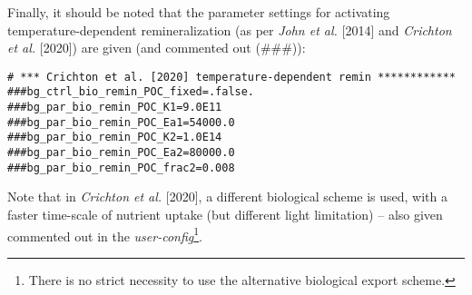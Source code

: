 \begin{itemize}[noitemsep]
\vspace{1mm}
Finally, it should be noted that the parameter settings for activating temperature-dependent remineralization (as per \textit{John et al.} [2014] and \textit{Crichton et al.} [2020]) are given (and commented out (\#\#\#)):
\small\vspace{-1mm}\begin{verbatim}
# *** Crichton et al. [2020] temperature-dependent remin ************
###bg_ctrl_bio_remin_POC_fixed=.false.
###bg_par_bio_remin_POC_K1=9.0E11
###bg_par_bio_remin_POC_Ea1=54000.0
###bg_par_bio_remin_POC_K2=1.0E14
###bg_par_bio_remin_POC_Ea2=80000.0
###bg_par_bio_remin_POC_frac2=0.008
\end{verbatim}\vspace{-1mm}\normalsize
Note that in \textit{Crichton et al.} [2020], a different biological scheme is used, with a faster time-scale of nutrient uptake (but different light limitation) -- also given commented out in the \textit{user-config}\footnote{There is no strict necessity to use the alternative biological export scheme.}.


\end{itemize}
